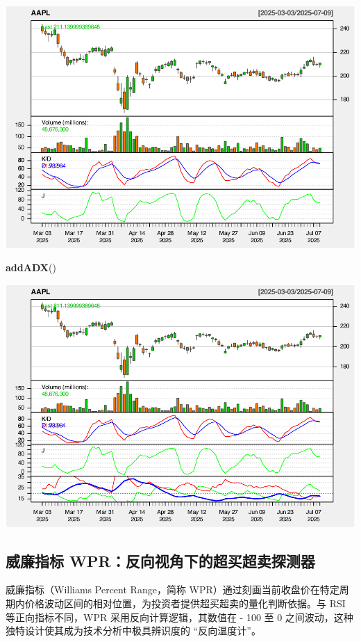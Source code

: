 \documentclass[]{ctexbook}
\newenvironment{Shaded}{\begin{snugshade}}{\end{snugshade}}
\newcommand{\FunctionTok}[1]{\textcolor[rgb]{0.13,0.29,0.53}{\textbf{#1}}}
\newcommand{\NormalTok}[1]{#1}
\begin{document}
\includegraphics[width=0.9\linewidth]{quantmod_files/figure-latex/kdj_2-4}

\begin{Shaded}
\begin{Highlighting}[]
\FunctionTok{addADX}\NormalTok{()}
\end{Highlighting}
\end{Shaded}

\includegraphics[width=0.9\linewidth]{quantmod_files/figure-latex/kdj_2-5}

\subsection{威廉指标 WPR：反向视角下的超买超卖探测器}\label{ux5a01ux5ec9ux6307ux6807-wprux53cdux5411ux89c6ux89d2ux4e0bux7684ux8d85ux4e70ux8d85ux5356ux63a2ux6d4bux5668}

威廉指标（Williams Percent Range，简称 WPR）通过刻画当前收盘价在特定周期内价格波动区间的相对位置，为投资者提供超买超卖的量化判断依据。与 RSI 等正向指标不同，WPR 采用反向计算逻辑，其数值在 - 100 至 0 之间波动，这种独特设计使其成为技术分析中极具辨识度的 ``反向温度计''。
\end{document}
